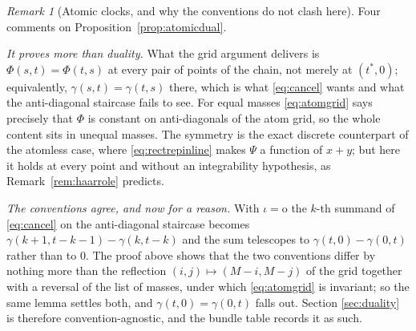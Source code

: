 \documentclass[11pt,a4paper]{article}
\theoremstyle{plain}
\theoremstyle{definition}
\theoremstyle{remark}
\newtheorem{remark}[theorem]{Remark}
\begin{document}
\begin{remark}[Atomic clocks, and why the conventions do not clash here]
  \label{rem:atomicdual}
  Four comments on Proposition~\ref{prop:atomicdual}.

  \emph{It proves more than duality.}  What the grid argument delivers is
  $\Phi(s,t) = \Phi(t,s)$ at every pair of points of the chain, not merely at
  $(t^*,0)$; equivalently, $\gamma(s,t) = \gamma(t,s)$ there, which is what
  \eqref{eq:cancel} wants and what the anti-diagonal staircase fails to see.  For
  equal masses \eqref{eq:atomgrid} says precisely that $\Phi$ is constant on
  anti-diagonals of the atom grid, so the whole content sits in unequal masses.
  The symmetry is the exact discrete counterpart of the atomless case, where
  \eqref{eq:rectrepinline} makes $\Psi$ a function of $x+y$; but here it holds at
  every point and without an integrability hypothesis, as
  Remark~\ref{rem:haarrole} predicts.

  \emph{The conventions agree, and now for a reason.}  With
  $\iota = \mathrm{o}$ the $k$-th summand of \eqref{eq:cancel} on the
  anti-diagonal staircase becomes $\gamma(k{+}1,t{-}k{-}1) - \gamma(k,t{-}k)$ and
  the sum telescopes to $\gamma(t,0) - \gamma(0,t)$ rather than to $0$.  The
  proof above shows that the two conventions differ by nothing more than the
  reflection $(i,j) \mapsto (M{-}i,M{-}j)$ of the grid together with a reversal of
  the list of masses, under which \eqref{eq:atomgrid} is invariant; so the same
  lemma settles both, and $\gamma(t,0) = \gamma(0,t)$ falls out.  Section
  \ref{sec:duality} is therefore convention-agnostic, and the bundle table
  records it as such.


\end{remark}
\end{document}
